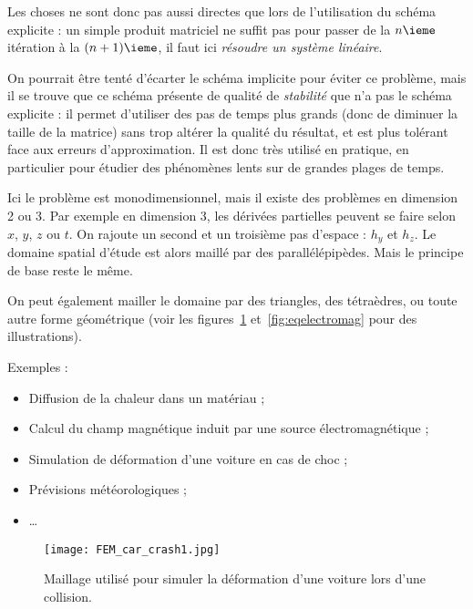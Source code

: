Les choses ne sont donc pas aussi directes que lors de l'utilisation du schéma explicite : un simple produit matriciel 
ne suffit pas pour passer de la $n\ieme$ itération à la $(n+1)\ieme$, il faut ici \emph{résoudre un système linéaire}.

On pourrait être tenté d'écarter le schéma implicite pour éviter ce problème, mais il se trouve que ce schéma présente 
de qualité de \emph{stabilité} que n'a pas le schéma explicite : il permet d'utiliser des pas de temps plus grands 
(donc de diminuer la taille de la matrice) sans trop altérer la qualité du résultat, et est plus tolérant face aux 
erreurs d'approximation. Il est donc très utilisé en pratique, en particulier pour étudier des phénomènes lents sur de 
grandes plages de temps.

Ici le problème est monodimensionnel, mais il existe des problèmes en dimension 2 ou 3. Par exemple en dimension 3, les 
dérivées partielles peuvent se faire selon $x$, $y$, $z$ ou $t$. On rajoute un second et un troisième pas 
d'espace : $h_y$ et $h_z$. Le domaine spatial d'étude est alors maillé par des parallélépipèdes. Mais le principe de 
base reste le même.

On peut également mailler le domaine par des triangles, des tétraèdres, ou toute autre forme géométrique (voir les figures~\ref{fig:carcrash} et~\ref{fig:eqelectromag} pour des illustrations).


Exemples :

\begin{itemize}
\item Diffusion de la chaleur dans un matériau ;
\item Calcul du champ magnétique induit par une source électromagnétique ;
\item Simulation de déformation d'une voiture en cas de choc ;
\item Prévisions météorologiques ;
\item \ldots{}
\end{itemize}

\begin{figure}
\begin{center}
\texttt{[image: FEM\_car\_crash1.jpg]}  
\caption{Maillage utilisé pour simuler la déformation d'une voiture lors d'une collision.}
\label{fig:carcrash}
\end{center}
\end{figure}


